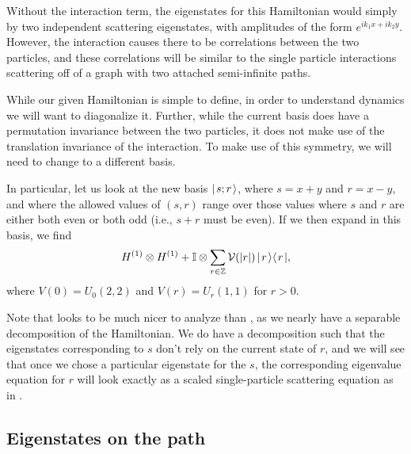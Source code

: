 \documentclass[../thesis-main/thesis-main]{subfiles}
\begin{document}
Without the interaction term, the eigenstates for this Hamiltonian would simply by two independent scattering eigenstates, with amplitudes of the form $e^{i k_1 x + i k_2y}$.  However, the interaction causes there to be correlations between the two particles, and these correlations will be similar to the single particle interactions scattering off of a graph with two attached semi-infinite paths.  


While our given Hamiltonian  is simple to define, in order to understand dynamics we will want to diagonalize it.  Further, while the current basis does have a permutation invariance between the two particles, it does not make use of the translation invariance of the interaction.  To make use of this symmetry, we will need to change to a different basis.

In particular, let us look at the new basis $|\mspace{2mu} s;r \mspace{2mu} \rangle$, where $s = x+y$ and $r = x-y$, and where the allowed values of $(s,r)$ range over those values where $s$ and $r$ are either both even or both odd (i.e., $s+r$ must be even).  If we then expand  in this basis, we find 
\begin{equation}
  H^{(1)}\otimes H^{(1)} + \mathbb{I}\otimes \sum_{r\in \mathbb{Z}} \mathcal{V}(|r|) \, |\mspace{2mu} r \mspace{2mu} \rangle\langle\mspace{2mu} r \mspace{2mu} |,
\label{eq:two_part_H_rs}
\end{equation}
where $V(0) = U_0(2,2)$ and $V(r) = U_r(1,1)$ for $r >0$.  

Note that  looks to be much nicer to analyze than , as we nearly have a separable decomposition of the Hamiltonian.  We do have a decomposition such that the eigenstates corresponding to $s$ don't rely on the current state of $r$, and we will see that once we chose a particular eigenstate for the $s$, the corresponding eigenvalue equation for $r$ will look exactly as a scaled single-particle scattering equation as in .

\subsection{Eigenstates on the path}
\end{document}
